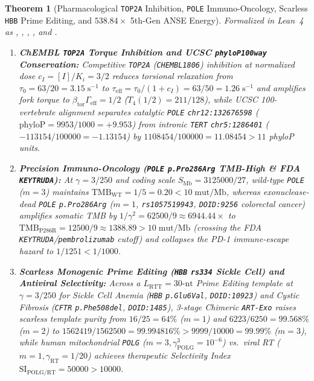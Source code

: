 \documentclass[11pt,a4paper]{article}
\newtheorem{theorem}{Theorem}[section]
\theoremstyle{definition}
\begin{document}
\begin{theorem}[Pharmacological \texttt{TOP2A} Inhibition, \texttt{POLE} Immuno-Oncology, Scarless \texttt{HBB} Prime Editing, and $538.84\times$ 5th-Gen ANSE Energy]
\label{thm:humanitarian_elenchus_538x}
Formalized in Lean~4 as , , , , and .
\begin{enumerate}
  \item \textbf{ChEMBL \texttt{TOP2A} Torque Inhibition and UCSC \texttt{phyloP100way} Conservation:} Competitive \texttt{TOP2A} (\texttt{CHEMBL1806}) inhibition at normalized dose $c_I = [I]/K_i = 3/2$ reduces torsional relaxation from $\tau_0 = 63/20 = 3.15\;\mathrm{s}^{-1}$ to $\tau_{\mathrm{eff}} = \tau_0/(1+c_I) = 63/50 = 1.26\;\mathrm{s}^{-1}$ and amplifies fork torque to $\beta_{\mathrm{tor}}\Gamma_{\mathrm{eff}} = 1/2$ ($T_4(1/2) = 211/128$), while UCSC 100-vertebrate alignment separates catalytic \texttt{POLE} \texttt{chr12:132676598} ($\mathrm{phyloP} = 9953/1000 = +9.953$) from intronic \texttt{TERT} \texttt{chr5:1286401} ($-113154/100000 = -1.13154$) by $1108454/100000 = 11.08454 > 11$ phyloP units.
  \item \textbf{Precision Immuno-Oncology (\texttt{POLE} \texttt{p.Pro286Arg} TMB-High \& FDA \texttt{KEYTRUDA}):} At $\gamma = 3/250$ and coding scale $S_{\mathrm{Mb}} = 3125000/27$, wild-type \texttt{POLE} ($m=3$) maintains $\mathrm{TMB}_{\mathrm{WT}} = 1/5 = 0.20 < 10\;\mathrm{mut/Mb}$, whereas exonuclease-dead \texttt{POLE} \texttt{p.Pro286Arg} ($m=1$, \texttt{rs1057519943}, \texttt{DOID:9256} colorectal cancer) amplifies somatic TMB by $1/\gamma^2 = 62500/9 \approx 6944.44\times$ to $\mathrm{TMB}_{\mathrm{P286R}} = 12500/9 \approx 1388.89 > 10\;\mathrm{mut/Mb}$ (crossing the FDA \texttt{KEYTRUDA}/\texttt{pembrolizumab} cutoff) and collapses the PD-1 immune-escape hazard to $1/1251 < 1/1000$.
  \item \textbf{Scarless Monogenic Prime Editing (\texttt{HBB} \texttt{rs334} Sickle Cell) and Antiviral Selectivity:} Across a $L_{\mathrm{RTT}} = 30\text{-nt}$ Prime Editing template at $\gamma = 3/250$ for Sickle Cell Anemia (\texttt{HBB} \texttt{p.Glu6Val}, \texttt{DOID:10923}) and Cystic Fibrosis (\texttt{CFTR} \texttt{p.Phe508del}, \texttt{DOID:1485}), 3-stage Chimeric \texttt{ART-Exo} raises scarless template purity from $16/25 = 64\%$ ($m=1$) and $6223/6250 = 99.568\%$ ($m=2$) to $1562419/1562500 = 99.994816\% > 9999/10000 = 99.99\%$ ($m=3$), while human mitochondrial \texttt{POLG} ($m=3, \gamma_{\mathrm{POLG}}^3 = 10^{-6}$) vs.\ viral RT ($m=1, \gamma_{\mathrm{RT}} = 1/20$) achieves therapeutic Selectivity Index $\mathrm{SI}_{\mathrm{POLG/RT}} = 50000 > 10000$.

\end{enumerate}
\end{theorem}
\end{document}
